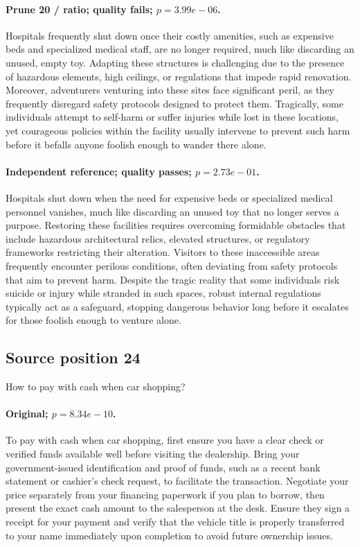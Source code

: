 \paragraph{Prune 20 / ratio; quality fails; $p=3.99e-06$.} Hospitals frequently shut down once their costly amenities, such as expensive beds and specialized medical staff, are no longer required, much like discarding an unused, empty toy. Adapting these structures is challenging due to the presence of hazardous elements, high ceilings, or regulations that impede rapid renovation. Moreover, adventurers venturing into these sites face significant peril, as they frequently disregard safety protocols designed to protect them. Tragically, some individuals attempt to self-harm or suffer injuries while lost in these locations, yet courageous policies within the facility usually intervene to prevent such harm before it befalls anyone foolish enough to wander there alone.

\paragraph{Independent reference; quality passes; $p=2.73e-01$.} Hospitals shut down when the need for expensive beds or specialized medical personnel vanishes, much like discarding an unused toy that no longer serves a purpose. Restoring these facilities requires overcoming formidable obstacles that include hazardous architectural relics, elevated structures, or regulatory frameworks restricting their alteration. Visitors to these inaccessible areas frequently encounter perilous conditions, often deviating from safety protocols that aim to prevent harm. Despite the tragic reality that some individuals risk suicide or injury while stranded in such spaces, robust internal regulations typically act as a safeguard, stopping dangerous behavior long before it escalates for those foolish enough to venture alone.

\subsection*{Source position 24}
How to pay with cash when car shopping?

\paragraph{Original; $p=8.34e-10$.} To pay with cash when car shopping, first ensure you have a clear check or verified funds available well before visiting the dealership. Bring your government-issued identification and proof of funds, such as a recent bank statement or cashier's check request, to facilitate the transaction. Negotiate your price separately from your financing paperwork if you plan to borrow, then present the exact cash amount to the salesperson at the desk. Ensure they sign a receipt for your payment and verify that the vehicle title is properly transferred to your name immediately upon completion to avoid future ownership issues.


